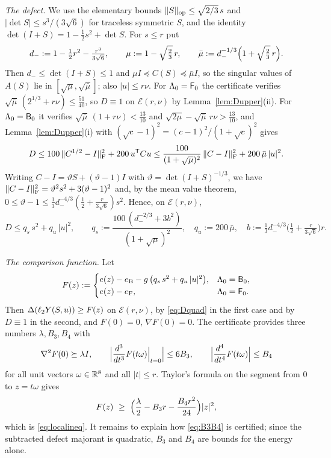 \emph{The defect.} We use the elementary bounds $\|S\|_{\mathrm{op}}\le\sqrt{2/3}\,s$ and $|\det S|\le s^3/(3\sqrt6)$ for traceless symmetric
$S$, and the identity $\det(I+S)=1-\frac12s^2+\det S$. For $s\le r$ put
\[
  d_-:=1-\tfrac12r^2-\tfrac{r^3}{3\sqrt6},\qquad \mu:=1-\sqrt{\tfrac23}\,r,\qquad \bar\mu:=d_-^{-1/3}\Bigl(1+\sqrt{\tfrac23}\,r\Bigr).
\]
Then $d_-\le\det(I+S)\le1$ and $\mu I\preceq C(S)\preceq\bar\mu I$, so the singular values of $A(S)$ lie in
$[\sqrt\mu,\sqrt{\bar\mu}]$; also $|u|\le r\nu$. For $\Lambda_0=\mathsf F_0$ the certificate verifies
$\sqrt{\bar\mu}\,(2^{1/3}+r\nu)\le\frac{51}{40}$, so $D\equiv1$ on $\mathcal E(r,\nu)$ by Lemma~\ref{lem:Dupper}(ii). For
$\Lambda_0=\mathsf B_0$ it verifies $\sqrt{\bar\mu}\,(1+r\nu)<\frac{13}{10}$ and $\sqrt{2\mu}-\sqrt{\bar\mu}\,r\nu>\frac{13}{10}$, and
Lemma~\ref{lem:Dupper}(i) with $(\sqrt c-1)^2=(c-1)^2/(1+\sqrt c)^2$ gives
\[
  D\le100\,\|C^{1/2}-I\|_\mathrm F^2+200\,u^\mathsf T Cu\le\frac{100}{(1+\sqrt\mu)^2}\,\|C-I\|_\mathrm F^2+200\,\bar\mu\,|u|^2 .
\]
Writing $C-I=\vartheta S+(\vartheta-1)I$ with $\vartheta=\det(I+S)^{-1/3}$, we have
$\|C-I\|_\mathrm F^2=\vartheta^2s^2+3(\vartheta-1)^2$ and, by the mean value theorem,
$0\le\vartheta-1\le\frac13d_-^{-4/3}(\frac12+\frac r{3\sqrt6})s^2$. Hence, on $\mathcal E(r,\nu)$,
\begin{equation}\label{eq:Dquad}
  D\le q_s\,s^2+q_u\,|u|^2,\qquad q_s:=\frac{100\,(d_-^{-2/3}+3b^2)}{(1+\sqrt\mu)^2},\quad q_u:=200\,\bar\mu,\quad
  b:=\tfrac13d_-^{-4/3}\bigl(\tfrac12+\tfrac r{3\sqrt6}\bigr)r .
\end{equation}

\emph{The comparison function.} Let
\begin{equation}\label{eq:Fdef}
  F(z):=\begin{cases}e(z)-e_{\mathrm B}-g\,\bigl(q_s\,s^2+q_u\,|u|^2\bigr),&\Lambda_0=\mathsf B_0,\\ e(z)-e_{\mathrm F},&\Lambda_0=\mathsf F_0 .\end{cases}
\end{equation}
Then $\Delta(\ell_2 Y(S,u))\ge F(z)$ on $\mathcal E(r,\nu)$, by \eqref{eq:Dquad} in the first case and by $D\equiv1$ in the second, and
$F(0)=0$, $\nabla F(0)=0$. The certificate provides three numbers $\lambda,B_3,B_4$ with
\begin{equation}\label{eq:B3B4}
  \nabla^2F(0)\succeq\lambda I,\qquad \Bigl|\frac{d^3}{dt^3}F(t\omega)\Big|_{t=0}\Bigr|\le6B_3,\qquad
  \Bigl|\frac{d^4}{dt^4}F(t\omega)\Bigr|\le B_4
\end{equation}
for all unit vectors $\omega\in\mathbb R^8$ and all $|t|\le r$. Taylor's formula on the segment from $0$ to $z=t\omega$ gives
\[
  F(z)\ \ge\ \Bigl(\frac\lambda2-B_3r-\frac{B_4r^2}{24}\Bigr)|z|^2 ,
\]
which is \eqref{eq:localineq}. It remains to explain how \eqref{eq:B3B4} is certified; since the subtracted defect majorant is
quadratic, $B_3$ and $B_4$ are bounds for the energy alone.

